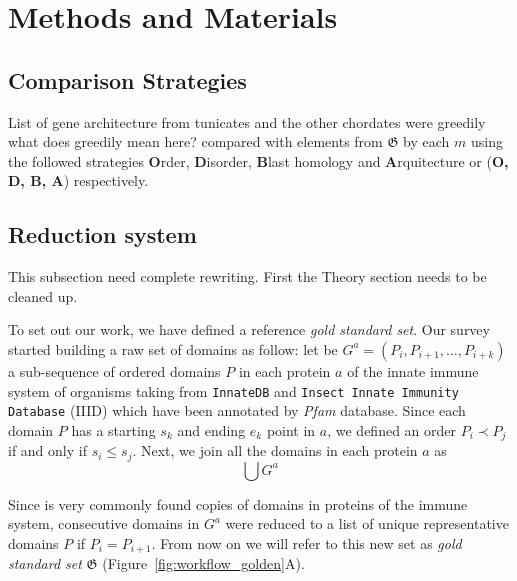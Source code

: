 \documentclass[11pt]{article}
\newcommand{\TODO}[1]{\begingroup\color{red}#1\endgroup}
\begin{document}
\section*{Methods and Materials}

\subsection*{Comparison Strategies}\label{comparison}

List of gene architecture from tunicates and the other chordates were
greedily \TODO{what does greedily mean here?} compared with elements from
$\boldsymbol{\mathfrak{G}}$ by each $m$ using the followed strategies
\textbf{O}rder, \textbf{D}isorder, \textbf{B}last homology and
\textbf{A}rquitecture or (\textbf{O, D, B, A}) respectively.

\subsection*{Reduction system}\label{reduction}

\TODO{This subsection need complete rewriting. First the Theory section
  needs to be cleaned up.} 

To set out our work, we have defined a reference \textsl{gold standard set}. 
Our survey started building a raw set of domains as follow: let be $G^{a} = 
(P_i,P_{i+1},\ldots,P_{i+k})$ a sub-sequence of ordered domains $P$ in each 
protein $a$ of the innate immune system of organisms taking from 
\texttt{InnateDB} and \texttt{Insect Innate Immunity Database} (IIID) which have 
been annotated by \textit{Pfam} database. Since each domain $P$ has a starting 
$s_k$ and ending $e_k$ point in $a$, we defined an order $P_i \prec P_j$ if and 
only if $s_i \le s_j$. Next, we join all the domains in each protein $a$ as 
\[\bigcup G^{a}\]

Since is very commonly found copies of domains in proteins of the immune 
system, consecutive domains in $G^{a}$ were reduced to a list of unique 
representative domains $P$ if $P_i = P_{i+1}$. From now on we will refer to this 
new set as \textsl{gold standard set} $\boldsymbol{\mathfrak{G}}$ 
(Figure~\ref{fig:workflow_golden}A).
  
\end{document}
